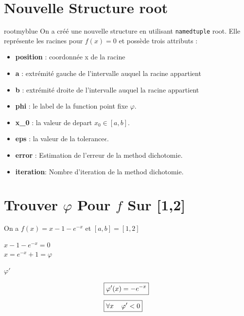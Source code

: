 \section{Nouvelle Structure root}
\begin{prettyBox}{root}{myblue}
On a créé une nouvelle structure en utilisant \texttt{namedtuple} root. Elle représente 
les racines pour \( f(x) = 0 \) et possède trois attributs :
\begin{itemize}
    \item \textbf{position} : coordonnée x de la racine
    \item \textbf{a} : extrémité gauche de l'intervalle auquel la racine appartient
    \item \textbf{b} : extrémité droite de l'intervalle auquel la racine appartient 
    \item \textbf{phi} : le label de la function point fixe \(\varphi\).
    \item \textbf{x\_0} : la valeur de depart \(x_0 \in [a,b]\).
    \item \textbf{eps} : la valeur de la tolerance\(\epsilon\).
    \item \textbf{error} : Estimation de l'erreur de la method dichotomie.
    \item \textbf{iteration}: Nombre d'iteration de la method dichotomie.
\end{itemize}
\end{prettyBox}
\vspace{0.5cm}


\vspace{1cm}
\section{Trouver \(\varphi\) Pour \(f\) Sur [1,2]}
On a \(f(x) = x - 1 - e^{-x} \) et \([a,b] = [1,2]\)

\vspace{0.75cm}
\begin{center}
    \(x - 1 - e^{-x} = 0\)\\[0.1cm]
    \(\boxed{x  =   e^{-x} + 1  = \varphi}\)\\[0.1cm]
\end{center}

\vspace{0.5cm}
\textbf{\underline{\(\varphi'\)}}
\begin{center}
    \begin{align*}
        &\boxed{\varphi'(x) = - e^{-x} }\\[0.15cm]
        &\boxed{\forall x \hspace{0.4cm} \varphi' < 0}
    \end{align*}
\end{center}

